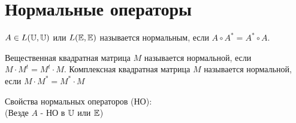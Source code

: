 \documentclass[../main.tex]{subfiles}
\begin{document}
\section{Нормальные операторы}
\begin{definition}
    $A \in L(\mathbb{U},\mathbb{U})$ или $ L(\mathbb{E},\mathbb{E})$ называется нормальным, если $A \circ A^{*} = A^{*} \circ A$.
\end{definition}
\begin{definition}
    Вещественная квадратная матрица $M$ называется нормальной, если $M \cdot M^{t} = M^{t} \cdot M$. Комплексная квадратная матрица $M$ называется нормальной, если $M \cdot M^{*} = M^{*} \cdot M$ 
\end{definition}
Свойства нормальных операторов (НО):
\\(Везде $A$ - НО в $\mathbb{U}$ или $\mathbb{E}$)
\end{document}
